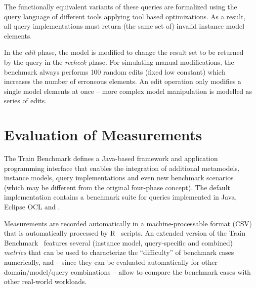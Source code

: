The functionally equivalent variants of these queries are formalized using the
query language of different tools applying tool based optimizations. As a
result, all query implementations must return (the same set of) invalid instance
model elements.
 
In the \emph{edit} phase, the model is modified to change the result set to be
returned by the query in the \emph{recheck} phase. For simulating manual
modifications, the benchmark always performs 100 random edits (fixed low
constant) which increases the number of erroneous elements. An edit operation
only modifies a single model elements at once -- more complex model manipulation is
modelled as series of edits.

\section{Evaluation of Measurements}
The Train Benchmark defines a Java-based framework and application programming
interface that enables the integration of additional metamodels, instance
models, query implementations and even new benchmark scenarios (which may be
different from the original four-phase concept). The default implementation
contains a benchmark suite for queries implemented in Java, Eclipse OCL and
\eiq{}.

Measurements are recorded automatically in a machine-processable format (CSV)
that is automatically processed by R~\cite{TB:R} scripts. An extended version of the Train
Benchmark~\cite{TB:ASE2013} features several (instance model, query-specific and
combined) \emph{metrics} that can be used to characterize the ``difficulty'' of
benchmark cases numerically, and -- since they can be evaluated automatically
for other domain/model/query combinations -- allow to compare the benchmark
cases with other real-world workloads.
